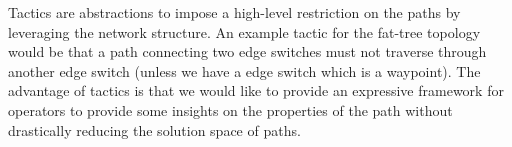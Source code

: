 \documentclass[]{sig}
\newtheorem{mydef}{Definition}
\begin{document}
Tactics are abstractions to impose a high-level restriction on the paths by leveraging the network structure. An example tactic for the fat-tree topology would be that a path connecting two edge switches must not traverse through another edge switch (unless we have a edge switch which is a waypoint). The advantage of tactics is that we would like to provide an expressive framework for operators to provide some insights on the properties of the path without drastically reducing the solution space of paths. 

%
\end{document}

